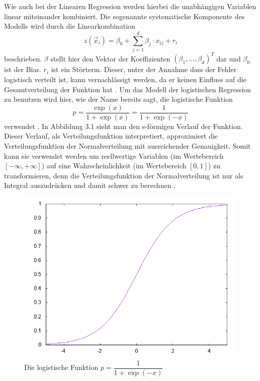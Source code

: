 Wie auch bei der Linearen Regression werden hierbei die unabhängigen Variablen linear miteinander kombiniert. Die sogenannte systematische Komponente des Modells wird durch die Linearkombination
\begin{displaymath}
z(\vec x_i)=\beta_0 + \sum_{j=1}^{d}{\beta_j \cdot x_{ij}} + r_i
\end{displaymath}
beschrieben. $\beta$ stellt hier den Vektor der Koeffizienten $(\beta_1 ,..., \beta_d)^T$ dar und $\beta_0$ ist der Bias. $r_i$ ist ein Störterm. Dieser, unter der Annahme dass der Fehler logistisch verteilt ist, kann vernachlässigt werden, da er keinen Einfluss auf die Gesamtverteilung der Funktion hat \cite{ROHR}.
Um das Modell der logistischen Regression zu benutzen wird hier, wie der Name bereits sagt, die logistische Funktion 
\begin{displaymath}
p=\dfrac{\exp(x)}{1+\exp(x)}=\dfrac{1}{1+\exp(-x)}
\end{displaymath}
verwendet \cite{BECK}.
In Abbildung 3.1 sieht man den s-förmigen Verlauf der Funktion. Dieser Verlauf, als Verteilungsfunktion interpretiert, approximiert die Verteilungsfunktion der Normalverteilung mit ausreichender Genauigkeit. Somit kann sie verwendet werden um reellwertige Variablen (im Wertebereich $[-\infty, +\infty]$) auf eine Wahrscheinlichkeit (im Wertebereich $[0,1]$) zu transformieren, denn die Verteilungsfunktion der Normalverteilung ist nur als Integral auszudrücken und damit schwer zu berechnen \cite{WIKI}\cite{BECK}.
\begin{figure}[ht]
\centering
\includegraphics[scale=0.75]{bilder/logistic_reg_func}
\caption{Die logistische Funktion $p=\dfrac{1}{1+\exp(-x)}$ }
\end{figure}\\
